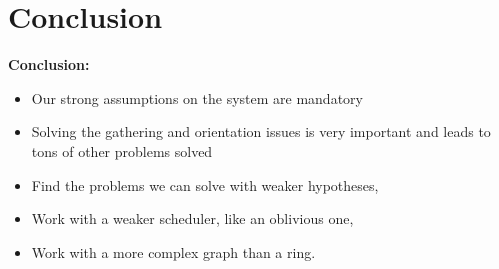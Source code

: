 \documentclass{beamer}
\begin{document}
\section{Conclusion}
\begin{frame}
	\textbf{Conclusion:}
	\begin{itemize}
		\item<2-> Our strong assumptions on the system are mandatory
		\item<3-> Solving the gathering and orientation issues is very important and leads to tons of other problems solved
	\end{itemize}
	
	\begin{itemize}
		\item<5-> Find the problems we can solve with weaker hypotheses,
		\item<6-> Work with a weaker scheduler, like an oblivious one,
		\item<7-> Work with a more complex graph than a ring.
	\end{itemize}
	
\end{frame}
\end{document}
